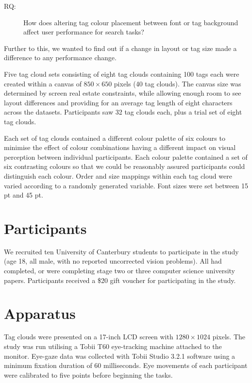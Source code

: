 \begin{description}
\item[RQ:]How does altering tag colour placement between font or tag background affect user performance for search tasks? 
\end{description}

Further to this, we wanted to find out if a change in layout or tag size made a difference to any performance change.

Five tag cloud sets consisting of eight tag clouds containing 100 tags each were created within a canvas of $850 \times 650$ pixels (40 tag clouds). The canvas size was determined by screen real estate constraints, while allowing enough room to see layout differences and providing for an average tag length of eight characters across the datasets. Participants saw 32 tag clouds each, plus a trial set of eight tag clouds. 

Each set of tag clouds contained a different colour palette of six colours to minimise the effect of colour combinations having a different impact on visual perception between individual participants. Each colour palette contained a set of six contrasting colours so that we could be reasonably assured participants could distinguish each colour.  Order and size mappings within each tag cloud were varied according to a randomly generated variable. Font sizes were set between 15 pt and 45 pt.

\section{Participants}\label{sect:exp1participants}
We recruited ten University of Canterbury students to participate in the study (age 18, all male, with no reported uncorrected vision problems). All had completed, or were completing stage two or three computer science university papers. Participants received a \$20 gift voucher for participating in the study.

\section{Apparatus}\label{sect:apparatusexp1}
Tag clouds were presented on a 17-inch LCD screen with $1280 \times 1024$ pixels. The study was run utilising a Tobii T60 eye-tracking machine attached to the monitor. Eye-gaze data was collected with Tobii Studio 3.2.1 software using a minimum fixation duration of 60 milliseconds. Eye movements of each participant were calibrated to five points before beginning the tasks.

